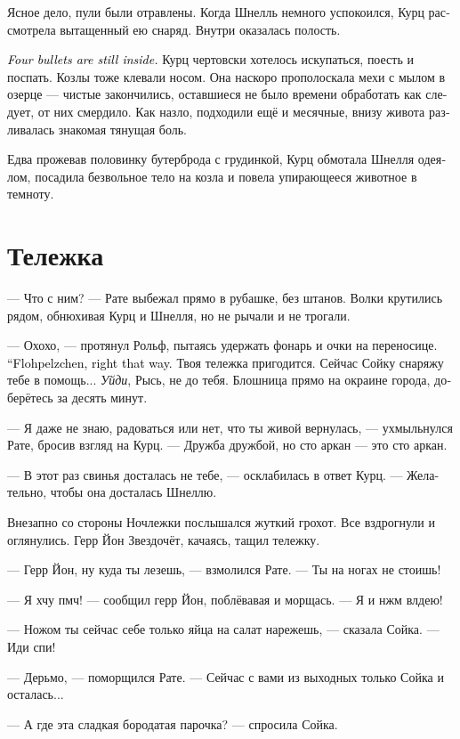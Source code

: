 \documentclass[a4paper,12pt,fleqn]{book}\usepackage{cooltooltips}\usepackage{polyglossia}\setdefaultlanguage[babelshorthands=true]{russian}\setotherlanguage{english}\defaultfontfeatures{Ligatures=TeX,Mapping=tex-text} \usepackage{xcolor}\definecolor{lightgray}{HTML}{bbbbbb}\color{lightgray}\newcommand{\ml}[3]{\textenglish{\textcolor{black}{#3}}}
\begin{document}
Ясное дело, пули были отравлены.
Когда Шнелль немного успокоился, Курц рассмотрела вытащенный ею снаряд.
Внутри оказалась полость.

\ml{$0$}
{<<Четыре пули всё ещё там>>.}
{\textit{Four bullets are still inside.}}
Курц чертовски хотелось искупаться, поесть и поспать.
Козлы тоже клевали носом.
Она наскоро прополоскала мехи с мылом в озерце --- чистые закончились, оставшиеся не было времени обработать как следует, от них смердило.
Как назло, подходили ещё и месячные, внизу живота разливалась знакомая тянущая боль.

Едва прожевав половинку бутерброда с грудинкой, Курц обмотала Шнелля одеялом, посадила безвольное тело на козла и повела упирающееся животное в темноту.

\section{Тележка}

--- Что с ним? --- Рате выбежал прямо в рубашке, без штанов.
Волки крутились рядом, обнюхивая Курц и Шнелля, но не рычали и не трогали.

--- Охохо, --- протянул Рольф, пытаясь удержать фонарь и очки на переносице.
\ml{$0$}
{--- Флопельцхен, прямой дорогой.}
{``Flohpelzchen, right that way.}
Твоя тележка пригодится.
Сейчас Сойку снаряжу тебе в помощь...
\textit{Уйди}, Рысь, не до тебя.
Блошница прямо на окраине города, доберётесь за десять минут.

--- Я даже не знаю, радоваться или нет, что ты живой вернулась, --- ухмыльнулся Рате, бросив взгляд на Курц.
--- Дружба дружбой, но сто аркан --- это сто аркан.

--- В этот раз свинья досталась не тебе, --- осклабилась в ответ Курц.
--- Желательно, чтобы она досталась Шнеллю.

Внезапно со стороны Ночлежки послышался жуткий грохот.
Все вздрогнули и оглянулись.
Герр Йон Звездочёт, качаясь, тащил тележку.

--- Герр Йон, ну куда ты лезешь, --- взмолился Рате.
--- Ты на ногах не стоишь!

--- Я хчу пмч! --- сообщил герр Йон, поблёвавая и морщась.
--- Я и нжм влдею!

--- Ножом ты сейчас себе только яйца на салат нарежешь, --- сказала Сойка.
--- Иди спи!

--- Дерьмо, --- поморщился Рате.
--- Сейчас с вами из выходных только Сойка и осталась...

--- А где эта сладкая бородатая парочка? --- спросила Сойка.
\end{document}
